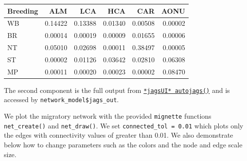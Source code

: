 \documentclass[
]{book}
\newenvironment{Shaded}{\begin{snugshade}}{\end{snugshade}}
\newcommand{\AttributeTok}[1]{\textcolor[rgb]{0.13,0.29,0.53}{#1}}
\newcommand{\CommentTok}[1]{\textcolor[rgb]{0.56,0.35,0.01}{\textit{#1}}}
\newcommand{\DecValTok}[1]{\textcolor[rgb]{0.00,0.00,0.81}{#1}}
\newcommand{\FloatTok}[1]{\textcolor[rgb]{0.00,0.00,0.81}{#1}}
\newcommand{\FunctionTok}[1]{\textcolor[rgb]{0.13,0.29,0.53}{\textbf{#1}}}
\newcommand{\NormalTok}[1]{#1}
\newcommand{\OtherTok}[1]{\textcolor[rgb]{0.56,0.35,0.01}{#1}}
\newcommand{\SpecialCharTok}[1]{\textcolor[rgb]{0.81,0.36,0.00}{\textbf{#1}}}
\newcommand{\StringTok}[1]{\textcolor[rgb]{0.31,0.60,0.02}{#1}}
\begin{document}
\begin{tabular}{l|r|r|r|r|r}
\hline
Breeding & ALM & LCA & HCA & CAR & AONU\\
\hline
WB & 0.14422 & 0.13388 & 0.01340 & 0.00508 & 0.00002\\
\hline
BR & 0.00014 & 0.00019 & 0.00009 & 0.01655 & 0.00006\\
\hline
NT & 0.05010 & 0.02698 & 0.00011 & 0.38497 & 0.00005\\
\hline
ST & 0.00002 & 0.01126 & 0.03642 & 0.02810 & 0.06308\\
\hline
MP & 0.00011 & 0.00020 & 0.00023 & 0.00002 & 0.08470\\
\hline
\end{tabular}

The second component is the full output from \href{https://rdrr.io/cran/jagsUI/man/autojags.html}{\texttt{*jagsUI*\ autojags()}} and is accessed by \texttt{network\_model\$jags\_out}.

We plot the migratory network with the provided \texttt{mignette} functions \texttt{net\_create()} and \texttt{net\_draw()}. We set \texttt{connected\_tol\ =\ 0.01} which plots only the edges with connectivity values of greater than 0.01. We also demonstrate below how to change parameters such as the colors and the node and edge scale size.

\begin{Shaded}
\end{Shaded}
\end{document}

